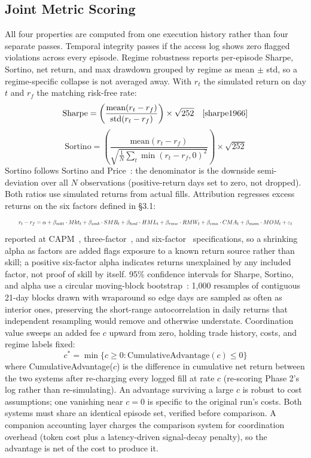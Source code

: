 \documentclass{article}
\begin{document}
\subsection{Joint Metric Scoring}
All four properties are computed from one execution history rather than four separate passes. Temporal integrity passes if the access log shows zero flagged violations across every episode. Regime robustness reports per-episode Sharpe, Sortino, net return, and max drawdown grouped by regime as mean $\pm$ std, so a regime-specific collapse is not averaged away.
With $r_t$ the simulated return on day $t$ and $r_f$ the matching risk-free rate:
\[
\text{Sharpe} = \left(\frac{\text{mean}(r_t - r_f)}{\text{std}(r_t - r_f)}\right) \times \sqrt{252} \quad \cite{sharpe1966}
\]
\[
\text{Sortino} = \left(\frac{\text{mean}(r_t - r_f)}{\sqrt{\frac{1}{N}\sum_t \min(r_t - r_f, 0)^2}}\right) \times \sqrt{252}
\]
Sortino follows Sortino and Price~\cite{sortino1994}: the denominator is the downside semi-deviation over all $N$ observations (positive-return days set to zero, not dropped). Both ratios use simulated returns from actual fills.
Attribution regresses excess returns on the six factors defined in \S3.1:
\begin{equation*}
\resizebox{0.95\textwidth}{!}{$\displaystyle
r_t - r_f = \alpha + \beta_{mkt}\cdot Mkt_t + \beta_{smb}\cdot SMB_t + \beta_{hml}\cdot HML_t + \beta_{rmw}\cdot RMW_t + \beta_{cma}\cdot CMA_t + \beta_{mom}\cdot MOM_t + \varepsilon_t
$}
\end{equation*}
reported at CAPM~\cite{sharpe1964}, three-factor~\cite{fama1993}, and six-factor~\cite{fama2015,carhart1997} specifications, so a shrinking alpha as factors are added flags exposure to a known return source rather than skill; a positive six-factor alpha indicates returns unexplained by any included factor, not proof of skill by itself.
95\% confidence intervals for Sharpe, Sortino, and alpha use a circular moving-block bootstrap~\cite{politis1992,kunsch1989}: 1,000 resamples of contiguous 21-day blocks drawn with wraparound so edge days are sampled as often as interior ones, preserving the short-range autocorrelation in daily returns that independent resampling would remove and otherwise understate.
Coordination value sweeps an added fee $c$ upward from zero, holding trade history, costs, and regime labels fixed:
\[
c^* = \min\{c \geq 0 : \text{CumulativeAdvantage}(c) \leq 0\}
\]
where CumulativeAdvantage($c$) is the difference in cumulative net return between the two systems after re-charging every logged fill at rate $c$ (re-scoring Phase 2's log rather than re-simulating). An advantage surviving a large $c$ is robust to cost assumptions; one vanishing near $c=0$ is specific to the original run's costs. Both systems must share an identical episode set, verified before comparison. A companion accounting layer charges the comparison system for coordination overhead (token cost plus a latency-driven signal-decay penalty), so the advantage is net of the cost to produce it.
\end{document}
